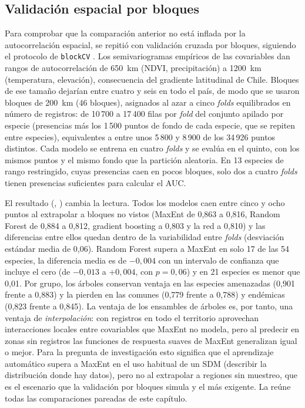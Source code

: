 \subsection{Validación espacial por bloques}

Para comprobar que la comparación anterior no está inflada por la
autocorrelación espacial, se repitió con validación cruzada por bloques,
siguiendo el protocolo de \texttt{blockCV} \citep{valavi2019blockcv}. Los
semivariogramas empíricos de las covariables dan rangos de autocorrelación
de \SI{650}{\kilo\metre} (NDVI, precipitación) a \SI{1200}{\kilo\metre}
(temperatura, elevación), consecuencia del gradiente latitudinal de Chile.
Bloques de ese tamaño dejarían entre cuatro y seis en todo el país,
de modo que se usaron bloques de \SI{200}{\kilo\metre} (46 bloques),
asignados al azar a cinco \textit{folds} equilibrados en número de
registros: de 10\,700 a 17\,400 filas por \textit{fold} del conjunto apilado
por especie (presencias más los 1\,500 puntos de fondo de cada especie, que
se repiten entre especies), equivalentes a entre unos 5\,800 y 8\,900 de los
34\,926 puntos distintos. Cada modelo se
entrena en cuatro \textit{folds} y se evalúa en el quinto, con los mismos
puntos y el mismo fondo que la partición aleatoria. En 13 especies de rango
restringido, cuyas presencias caen en pocos bloques, solo dos a cuatro
\textit{folds} tienen presencias suficientes para calcular el AUC.

El resultado (, ) cambia la
lectura. Todos los modelos caen entre cinco y ocho puntos al extrapolar a
bloques no vistos (MaxEnt de 0,863 a 0,816, Random Forest de 0,884 a 0,812,
gradient boosting a 0,803 y la red a 0,810) y las diferencias entre ellos
quedan dentro de la variabilidad entre \textit{folds} (desviación estándar
media de 0,06). Random Forest supera a MaxEnt en solo 17 de las 54 especies, la diferencia
media es de $-0{,}004$ con un intervalo de confianza que incluye el cero (de
$-0{,}013$ a $+0{,}004$, con $p = 0{,}06$) y en 21 especies es menor que 0,01.
Por grupo, los árboles conservan
ventaja en las especies amenazadas (0,901 frente a 0,883) y la pierden en
las comunes (0,779 frente a 0,788) y endémicas (0,823 frente a 0,845). La
ventaja de los ensambles de árboles es, por tanto, una ventaja de
\emph{interpolación}: con registros en todo el territorio aprovechan
interacciones locales entre covariables que MaxEnt no modela, pero al
predecir en zonas sin registros las funciones de respuesta suaves de MaxEnt
generalizan igual o mejor. Para la pregunta de investigación esto significa
que el aprendizaje automático supera a MaxEnt en el uso habitual de un SDM
(describir la distribución donde hay datos), pero no al extrapolar a
regiones sin muestreo, que es el escenario que la validación por bloques
simula y el más exigente. La  reúne todas las
comparaciones pareadas de este capítulo.

